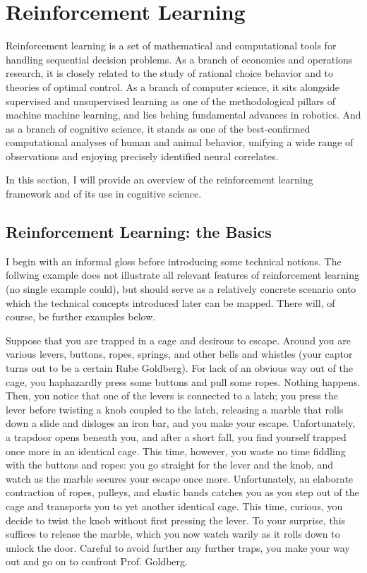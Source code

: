 \section{Reinforcement Learning}


Reinforcement learning is a set of mathematical and computational tools for handling sequential decision problems.
As a branch of economics and operations research, it is closely related to the study of rational choice behavior and to theories of optimal control.
As a branch of computer science, it sits alongside supervised and unsupervised learning as one of the methodological pillars of machine machine learning, and lies behing fundamental advances in robotics.
And as a branch of cognitive science, it stands as one of the best-confirmed computational analyses of human and animal behavior, unifying a wide range of observations and enjoying precisely identified neural correlates.

In this section, I will provide an overview of the reinforcement learning framework and of its use in cognitive science.

\subsection{Reinforcement Learning: the Basics}

I begin with an informal gloss before introducing some technical notions.
The follwing example does not illustrate all relevant features of reinforcement learning (no single example could), but should serve as a relatively concrete scenario onto which the technical concepts introduced later can be mapped.
There will, of course, be further examples below.

Suppose that you are trapped in a cage and desirous to escape.
Around you are various levers, buttons, ropes, springs, and other bells and whistles (your captor turns out to be a certain Rube Goldberg).
For lack of an obvious way out of the cage, you haphazardly press some buttons and pull some ropes.
Nothing happens.
Then, you notice that one of the levers is connected to a latch; you press the lever before twisting a knob coupled to the latch, releasing a marble that rolls down a slide and disloges an iron bar, and you make your escape.
Unfortunately, a trapdoor opens beneath you, and after a short fall, you find yourself trapped once more in an identical cage.
This time, however, you waste no time fiddling with the buttons and ropes: you go straight for the lever and the knob, and watch as the marble secures your escape once more.
Unfortunately, an elaborate contraction of ropes, pulleys, and elastic bands catches you as you step out of the cage and transports you to yet another identical cage.
This time, curious, you decide to twist the knob without first pressing the lever.
To your surprise, this suffices to release the marble, which you now watch warily as it rolls down to unlock the door.
Careful to avoid further any further traps, you make your way out and go on to confront Prof. Goldberg.


